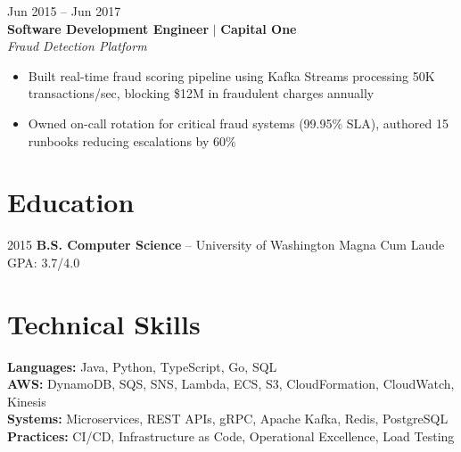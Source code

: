 \documentclass[11pt,letterpaper]{article}
\begin{document}
{\color{accent}\small Jun 2015 -- Jun 2017} \hfill \\[-12pt]

\textbf{Software Development Engineer} $\mid$ \textbf{Capital One} \\
\textit{Fraud Detection Platform}
\begin{itemize}
    \item Built real-time fraud scoring pipeline using Kafka Streams processing 50K transactions/sec, blocking \$12M in fraudulent charges annually
    \item Owned on-call rotation for critical fraud systems (99.95\% SLA), authored 15 runbooks reducing escalations by 60\%
\end{itemize}

\section{Education}

{\color{accent}\small 2015} \quad \textbf{B.S. Computer Science} -- University of Washington \quad Magna Cum Laude \quad GPA: 3.7/4.0

\section{Technical Skills}

\textbf{Languages:} Java, Python, TypeScript, Go, SQL \\
\textbf{AWS:} DynamoDB, SQS, SNS, Lambda, ECS, S3, CloudFormation, CloudWatch, Kinesis \\
\textbf{Systems:} Microservices, REST APIs, gRPC, Apache Kafka, Redis, PostgreSQL \\
\textbf{Practices:} CI/CD, Infrastructure as Code, Operational Excellence, Load Testing
\end{document}
